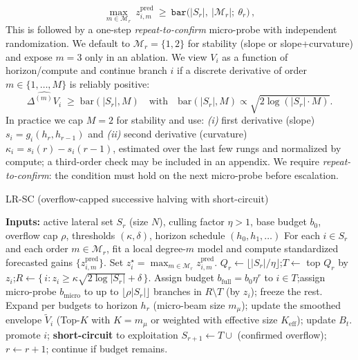 \documentclass{article}
\begin{document}
\begin{equation}
\max_{m\in\mathcal{M}_r}\ z^{\mathrm{pred}}_{i,m}\ \ge\ \texttt{bar}\!\big(|S_r|,\ |\mathcal{M}_r|;\ \theta_r\big)\,,
\end{equation}
This is followed by a one-step \emph{repeat-to-confirm} micro-probe with independent randomization. We default to $\mathcal{M}_r{=}\{1,2\}$ for stability (slope or slope+curvature) and expose $m{=}3$ only in an ablation. We view $V_i$ as a function of horizon/compute and continue branch $i$ if a discrete derivative of order $m\in\{1,\dots,M\}$ is reliably positive: \[ \widehat{\Delta^{(m)} V_i} \;\ge\; \text{bar}(|S_r|,M) \quad\text{with}\quad \text{bar}(|S_r|,M)\propto \sqrt{2\log(|S_r|\cdot M)}. \] In practice we cap $M=2$ for stability and use: \emph{(i)} first derivative (slope) $s_i = g_i(h_r,h_{r-1})$ and \emph{(ii)} second derivative (curvature) $\kappa_i = s_i(r)-s_i(r-1)$, estimated over the last few rungs and normalized by compute; a third-order check may be included in an appendix. We require \emph{repeat-to-confirm}: the condition must hold on the next micro-probe before escalation.

\begin{algorithm*}[t]
\caption{LR-SC (overflow-capped successive halving with short-circuit)}
\label{alg:lrscr}
\begin{algorithmic}[1]
\State \textbf{Inputs:} active lateral set $S_r$ (size $N$), culling factor $\eta>1$, base budget $b_0$, overflow cap $\rho$, thresholds $(\kappa,\delta)$, horizon schedule $(h_0,h_1,\dots)$
\State For each $i\in S_r$ and each order $m\in\mathcal{M}_r$, fit a local degree-$m$ model and compute standardized forecasted gains $\{z^{\mathrm{pred}}_{i,m}\}$. Set $z_i^{\star}=\max_{m\in\mathcal{M}_r} z^{\mathrm{pred}}_{i,m}$.
\State $Q_r \leftarrow \lfloor |S_r|/\eta \rfloor$;\quad $T \leftarrow$ top $Q_r$ by $z_i$;\quad $R \leftarrow \{\,i : z_i \ge \kappa \sqrt{2\log |S_r|} + \delta\,\}$.
\State Assign budget $b_{\text{full}} = b_0 \eta^r$ to $i\in T$;\quad assign micro-probe $b_{\text{micro}}$ to up to $\lfloor \rho |S_r|\rfloor$ branches in $R\setminus T$ (by $z_i$); freeze the rest.
\State Expand per budgets to horizon $h_r$ (micro-beam size $m_{\mu}$); update the smoothed envelope $\tilde V_i$ (Top-$K$ with $K{=}m_{\mu}$ or weighted with effective size $K_{\mathrm{eff}}$); update $B_t$.
  \State promote $i$; \textbf{short-circuit} to exploitation
\EndIf
\State $S_{r+1} \leftarrow T \cup$ (confirmed overflow); $r\leftarrow r+1$; continue if budget remains.
\end{algorithmic}
\end{algorithm*}\vspace{-0.5em}
\end{document}
